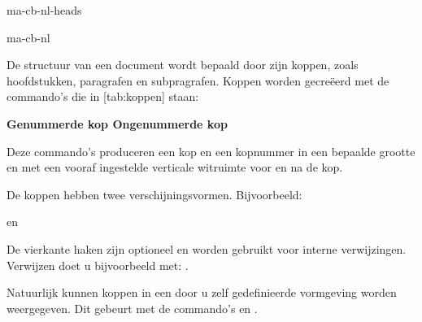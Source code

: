 \startonderdeel ma-cb-nl-heads

\produkt ma-cb-nl




De structuur van een document wordt bepaald door zijn
koppen, zoals hoofdstukken, paragrafen en subpragrafen.
Koppen worden gecre\"eerd met de commando's die in
[tab:koppen] staan:

\starttabel[|l|l|]
\HL
\NC \bf Genummerde kop    \NC \bf Ongenummerde kop \NC\SR
\HL
\NC {}       \NC {}           \NC\FR
\NC {}       \NC {}       \NC\MR
\NC {}    \NC {}    \NC\MR
\NC {} \NC {} \NC\MR
\NC \onbekend             \NC \onbekend             \NC\LR
\HL
\stoptabel


Deze commando's produceren een kop en een kopnummer in een
bepaalde grootte en met een vooraf ingestelde verticale
witruimte voor en na de kop.

De koppen hebben twee verschijningsvormen. Bijvoorbeeld:

\starttypen
{}
\stoptypen

en

\starttypen
{}
\stoptypen

De vierkante haken zijn optioneel en worden gebruikt voor
interne verwijzingen. Verwijzen doet u bijvoorbeeld met:
.

Natuurlijk kunnen koppen in een door u zelf gedefinieerde
vormgeving worden weergegeven. Dit gebeurt met de commando's
\type{\stelkopin} en .


\startbuffer
{}

\stelkopin
  [mijnkop]
  [nummerletter=vet,
   tekstletter=vet,
   voor={\haarlijn\pagina[nee]},
   na={\geenwitruimte\pagina[nee]\haarlijn}]

